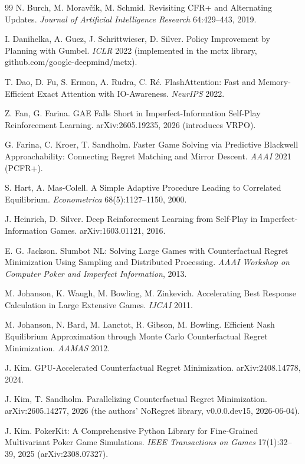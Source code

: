 \documentclass[11pt]{article}
\begin{document}
\begin{thebibliography}{99}
 N. Burch, M. Moravčík, M. Schmid. Revisiting CFR+
and Alternating Updates. \emph{Journal of Artificial Intelligence Research}
64:429--443, 2019.

 I. Danihelka, A. Guez, J. Schrittwieser, D. Silver. Policy
Improvement by Planning with Gumbel. \emph{ICLR} 2022 (implemented in the mctx library, github.com/google-deepmind/mctx).

 T. Dao, D. Fu, S. Ermon, A. Rudra, C. Ré. FlashAttention: Fast and
Memory-Efficient Exact Attention with IO-Awareness. \emph{NeurIPS} 2022.

 Z. Fan, G. Farina. GAE Falls Short in Imperfect-Information Self-Play
Reinforcement Learning. arXiv:2605.19235, 2026 (introduces VRPO).

 G. Farina, C. Kroer, T. Sandholm. Faster Game Solving via
Predictive Blackwell Approachability: Connecting Regret Matching and Mirror Descent.
\emph{AAAI} 2021 (PCFR+).

 S. Hart, A. Mas-Colell. A Simple Adaptive Procedure Leading
to Correlated Equilibrium. \emph{Econometrica} 68(5):1127--1150, 2000.

 J. Heinrich, D. Silver. Deep Reinforcement Learning from
Self-Play in Imperfect-Information Games. arXiv:1603.01121, 2016.

 E. G. Jackson. Slumbot NL: Solving Large Games with
Counterfactual Regret Minimization Using Sampling and Distributed Processing.
\emph{AAAI Workshop on Computer Poker and Imperfect Information}, 2013.

 M. Johanson, K. Waugh, M. Bowling, M. Zinkevich. Accelerating
Best Response Calculation in Large Extensive Games. \emph{IJCAI} 2011.

 M. Johanson, N. Bard, M. Lanctot, R. Gibson, M. Bowling.
Efficient Nash Equilibrium Approximation through Monte Carlo Counterfactual Regret
Minimization. \emph{AAMAS} 2012.

 J. Kim. GPU-Accelerated Counterfactual Regret Minimization.
arXiv:2408.14778, 2024.

 J. Kim, T. Sandholm. Parallelizing Counterfactual Regret
Minimization. arXiv:2605.14277, 2026 (the authors' NoRegret library, v0.0.0.dev15, 2026-06-04).

 J. Kim. PokerKit: A Comprehensive Python Library for Fine-Grained
Multivariant Poker Game Simulations. \emph{IEEE Transactions on Games} 17(1):32--39,
2025 (arXiv:2308.07327).


\end{thebibliography}
\end{document}
